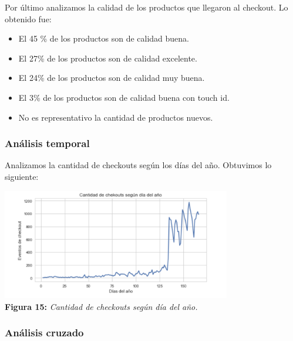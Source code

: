 \documentclass[titlepage,a4paper]{article}
\begin{document}
	Por último analizamos la calidad de los productos que llegaron al checkout. Lo obtenido fue:
	\begin{itemize}
	\item El 45 \% de los productos son de calidad buena. 
	\item El 27\% de los productos son de calidad excelente.
	\item El 24\% de los productos son de calidad muy buena. 
	\item El 3\% de los productos son de calidad buena con touch id. 
	\item No es representativo la cantidad de productos nuevos. 
	\end{itemize}
	\subsubsection{Análisis temporal}
	Analizamos la cantidad de checkouts según los días del año. Obtuvimos lo siguiente:
	\begin{center}
	\includegraphics[width=10cm] {cantidadDeCheckoutsSegunDiaDelAnio.jpg}\\
	\textbf{Figura 15:}  \textit{Cantidad de checkouts según día del año.}
	\end{center}
	
	\subsubsection{Análisis cruzado}
	
	
	
	
	
	
	

	
	
	
\end{document}

